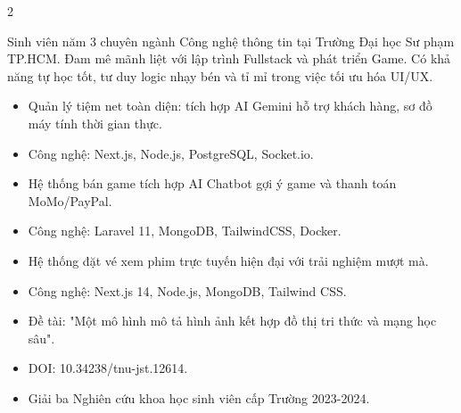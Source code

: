 \documentclass[10pt,a4paper,withhyper]{altacv}
\begin{document}



\makecvheader


\begin{paracol}{2}

Sinh viên năm 3 chuyên ngành Công nghệ thông tin tại Trường Đại học Sư phạm TP.HCM. Đam mê mãnh liệt với lập trình Fullstack và phát triển Game. Có khả năng tự học tốt, tư duy logic nhạy bén và tỉ mỉ trong việc tối ưu hóa UI/UX.


\begin{itemize}
\item Quản lý tiệm net toàn diện: tích hợp AI Gemini hỗ trợ khách hàng, sơ đồ máy tính thời gian thực.
\item Công nghệ: Next.js, Node.js, PostgreSQL, Socket.io.
\end{itemize}

\divider

\begin{itemize}
\item Hệ thống bán game tích hợp AI Chatbot gợi ý game và thanh toán MoMo/PayPal.
\item Công nghệ: Laravel 11, MongoDB, TailwindCSS, Docker.
\end{itemize}

\divider

\begin{itemize}
\item Hệ thống đặt vé xem phim trực tuyến hiện đại với trải nghiệm mượt mà.
\item Công nghệ: Next.js 14, Node.js, MongoDB, Tailwind CSS.
\end{itemize}


\begin{itemize}
\item Đề tài: "Một mô hình mô tả hình ảnh kết hợp đồ thị tri thức và mạng học sâu".
\item DOI: 10.34238/tnu-jst.12614.
\item Giải ba Nghiên cứu khoa học sinh viên cấp Trường 2023-2024.
\end{itemize}


\end{paracol}
\end{document}
